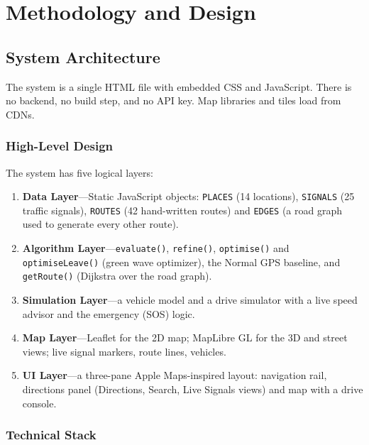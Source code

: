 \documentclass[12pt,a4paper]{report}
\begin{document}
\chapter{Methodology and Design}

\section{System Architecture}

The system is a single HTML file with embedded CSS and JavaScript. There is no
backend, no build step, and no API key. Map libraries and tiles load from CDNs.

\subsection{High-Level Design}

The system has five logical layers:

\begin{enumerate}
  \item \textbf{Data Layer}---Static JavaScript objects: \texttt{PLACES}
        (14 locations), \texttt{SIGNALS} (25 traffic signals), \texttt{ROUTES}
        (42 hand-written routes) and \texttt{EDGES} (a road graph used to
        generate every other route).
  \item \textbf{Algorithm Layer}---\texttt{evaluate()}, \texttt{refine()},
        \texttt{optimise()} and \texttt{optimiseLeave()} (green wave
        optimizer), the Normal GPS baseline, and \texttt{getRoute()}
        (Dijkstra over the road graph).
  \item \textbf{Simulation Layer}---a vehicle model and a drive simulator with
        a live speed advisor and the emergency (SOS) logic.
  \item \textbf{Map Layer}---Leaflet for the 2D map; MapLibre GL for the 3D
        and street views; live signal markers, route lines, vehicles.
  \item \textbf{UI Layer}---a three-pane Apple Maps-inspired layout: navigation
        rail, directions panel (Directions, Search, Live Signals views) and
        map with a drive console.
\end{enumerate}

\subsection{Technical Stack}
\end{document}
